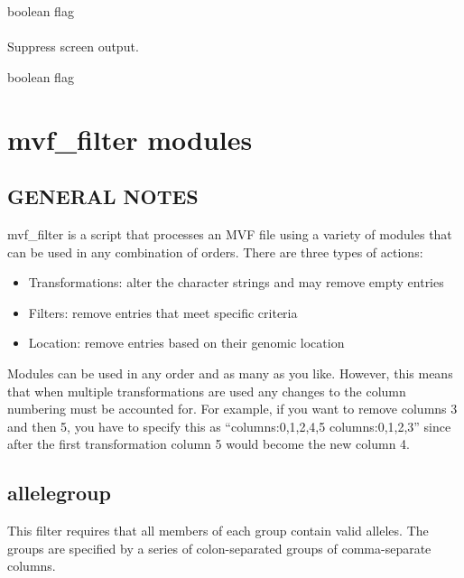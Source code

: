 \documentclass[letterpaper,11pt,english]{sphinxmanual}
\begin{document}
 boolean flag


\subsubsection{}
\label{\detokenize{prog_desc:id147}}
 Suppress screen output.

 boolean flag


\chapter{mvf\_filter modules}
\label{\detokenize{mvf_filter_modules::doc}}\label{\detokenize{mvf_filter_modules:mvf-filter-modules}}

\section{GENERAL NOTES}
\label{\detokenize{mvf_filter_modules:general-notes}}
mvf\_filter is a script that processes an MVF file using a variety
of modules that can be used in any combination of orders.  There
are three types of actions:
\begin{itemize}
\item {} 
Transformations: alter the character strings and may remove empty entries

\item {} 
Filters: remove entries that meet specific criteria

\item {} 
Location: remove entries based on their genomic location

\end{itemize}

Modules can be used in any order and as many as you like.  However,
this means that when multiple transformations are used any changes
to the column numbering must be accounted for.  For example,
if you want to remove columns 3 and then 5, you have to specify this as
“columns:0,1,2,4,5 columns:0,1,2,3” since after the first
transformation column 5 would become the new column 4.


\section{allelegroup}
\label{\detokenize{mvf_filter_modules:allelegroup}}
This filter requires that all members of each group contain
valid alleles.  The groups are specified by a series of colon-separated
groups of comma-separate columns.
\end{document}
